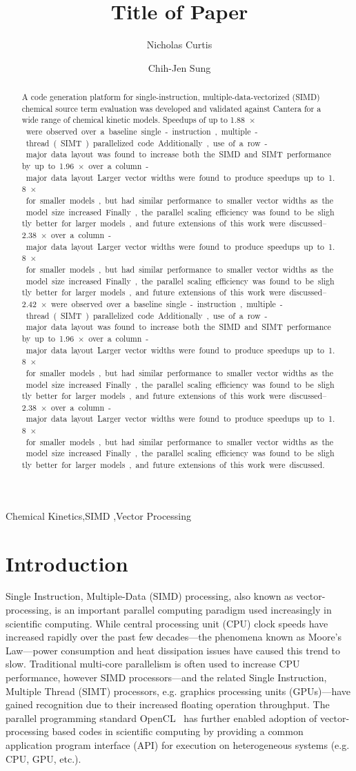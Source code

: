 \documentclass[12pt]{ussci}
\title{ Title of Paper }
\author[1,*]{Nicholas Curtis}
\author[1]{Chih-Jen Sung}
\affil[1]{Department of Mechanical Engineering, University of Connecticut, Storrs, CT 06269, USA}
\affil[*]{Corresponding author: \email{nicholas.curtis@uconn.edu}}
\begin{document}
\maketitle

\begin{abstract} %
A code generation platform for single-instruction, multiple-data-vectorized (SIMD) chemical source term evaluation was developed and validated against Cantera for a wide range of chemical kinetic models.
Speedups of up to \SIrange{1.88}{2.42}{$\times$} were observed over a baseline single-instruction, multiple-thread (SIMT) parallelized code.
Additionally, use of a row-major data layout was found to increase both the SIMD and SIMT performance by up to \SIrange{1.96}{2.38}{$\times$} over a column-major data layout.
Larger vector widths were found to produce speedups up to \SI{1.8}{$\times$} for smaller models, but had similar performance to smaller vector widths as the model size increased.
Finally, the parallel scaling efficiency was found to be slightly better for larger models, and future extensions of this work were discussed.
\end{abstract}

\begin{keyword}
    Chemical Kinetics\sep SIMD \sep Vector Processing
\end{keyword}

\section{Introduction}
%

Single Instruction, Multiple-Data (SIMD) processing, also known as vector-processing, is an important parallel computing paradigm used increasingly in scientific computing.
While central processing unit (CPU) clock speeds have increased rapidly over the past few decades---the phenomena known as Moore's Law---power consumption and heat dissipation issues have caused this trend to slow.
Traditional multi-core parallelism is often used to increase CPU performance, however SIMD processors---and the related Single Instruction, Multiple Thread (SIMT) processors, e.g. graphics processing units (GPUs)---have gained recognition due to their increased floating operation throughput.
The parallel programming standard OpenCL~\cite{stone2010opencl} has further enabled adoption of vector-processing based codes in scientific computing by providing a common application program interface (API) for execution on heterogeneous systems (e.g. CPU, GPU, etc.).
\end{document}
